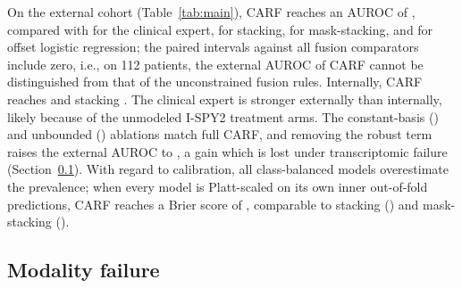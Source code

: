 \documentclass[runningheads]{llncs}
\begin{document}
On the external cohort (Table~\ref{tab:main}), CARF reaches an AUROC of \ExtCarf{}, compared with \ExtClin{} for the clinical expert, \ExtStack{} for stacking, \ExtMaskStack{} for mask-stacking, and \ExtOffset{} for offset logistic regression; the paired intervals against all fusion comparators include zero, i.e., on 112 patients, the external AUROC of CARF cannot be distinguished from that of the unconstrained fusion rules. Internally, CARF reaches \IntCarf{} and stacking \IntStack{}. The clinical expert is stronger externally than internally, likely because of the unmodeled I-SPY2 treatment arms. The constant-basis (\ExtNoContext{}) and unbounded (\ExtUnbounded{}) ablations match full CARF, and removing the robust term raises the external AUROC to \ExtNoRobust{}, a gain which is lost under transcriptomic failure (Section~\ref{sec:stress}). With regard to calibration, all class-balanced models overestimate the prevalence; when every model is Platt-scaled on its own inner out-of-fold predictions, CARF reaches a Brier score of \PlattBrierCarf{}, comparable to stacking (\PlattBrierStack{}) and mask-stacking (\PlattBrierMaskStack{}).

\subsection{Modality failure}
\label{sec:stress}

\begin{table}[t]
\centering
\caption{External AUROC under failure of one optional modality (mean of 30 realizations). Output-level corruptions permute the expert probability across patients; input-level corruptions alter the expert's inputs. The clinical expert alone reaches \ExtClin{}. $\Delta$ perm.: CARF minus model under RNA permutation, 95\% paired bootstrap interval (all scenarios in the supplement). Bold: best among the fusion baselines and CARF.}
\label{tab:stress}
\small
{}
\end{table}
\end{document}
